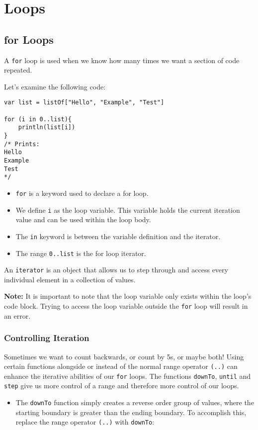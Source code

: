 \chapter{Loops}
\section{for Loops}
A \verb!for! loop is used when we know how many times we want a section of code repeated. 

Let's examine the following code: 

\begin{verbatim}
var list = listOf["Hello", "Example", "Test"]

for (i in 0..list){
    println(list[i])
}
/* Prints: 
Hello
Example
Test 
*/
\end{verbatim}

\begin{itemize}
    \item \verb!for! is a keyword used to declare a for loop.
    \item We define \verb!i! as the loop variable. 
    This variable holds the current iteration value and can be used within the loop body.
    \item The \verb!in! keyword is between the variable definition and the iterator.
    \item The range \verb!0..list! is the for loop iterator.
\end{itemize}

An \verb!iterator! is an object that allows us to step through and access every individual element in a collection of values. 

\textbf{Note: } It is important to note that the loop variable only exists within the loop’s code block. 
Trying to access the loop variable outside the \verb!for! loop will result in an error.
\newpage
\subsection{Controlling Iteration}
Sometimes we want to count backwards, or count by 5s, or maybe both! Using certain functions alongside or instead of the normal 
range operator \verb!(..)! can enhance the iterative abilities of our \verb!for! loops. The functions \verb!downTo!, \verb!until! and \verb!step! give us 
more control of a range and therefore more control of our loops.

\begin{itemize}
    \item The \verb!downTo! function simply creates a reverse order group of values, where the starting boundary is greater than the ending boundary.
To accomplish this, replace the range operator \verb!(..)! with \verb!downTo!:
\end{itemize}


